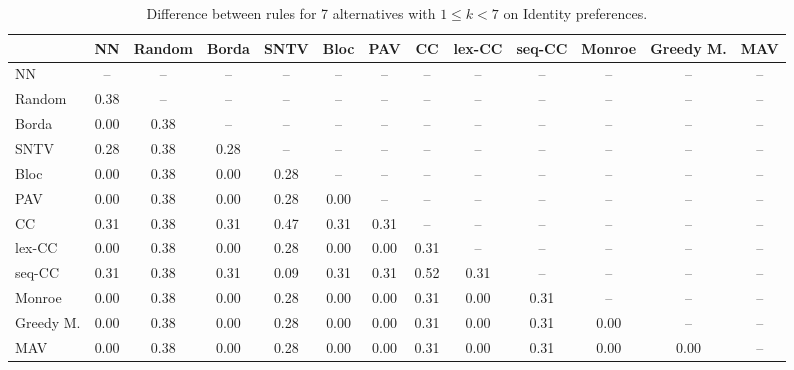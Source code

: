 
\begin{table*}[htbp]
\centering
\begin{tabular}{lcccccccccccc}
\toprule
 & NN & Random & Borda & SNTV & Bloc & PAV & CC & lex-CC & seq-CC & Monroe & Greedy M. & MAV \\
\midrule
NN & -- & -- & -- & -- & -- & -- & -- & -- & -- & -- & -- & -- \\
Random & \cellcolor{blue!38} 0.38 & -- & -- & -- & -- & -- & -- & -- & -- & -- & -- & -- \\
Borda & \cellcolor{blue!0} 0.00 & \cellcolor{blue!38} 0.38 & -- & -- & -- & -- & -- & -- & -- & -- & -- & -- \\
SNTV & \cellcolor{blue!28} 0.28 & \cellcolor{blue!38} 0.38 & \cellcolor{blue!28} 0.28 & -- & -- & -- & -- & -- & -- & -- & -- & -- \\
Bloc & \cellcolor{blue!0} 0.00 & \cellcolor{blue!38} 0.38 & \cellcolor{blue!0} 0.00 & \cellcolor{blue!28} 0.28 & -- & -- & -- & -- & -- & -- & -- & -- \\
PAV & \cellcolor{blue!0} 0.00 & \cellcolor{blue!38} 0.38 & \cellcolor{blue!0} 0.00 & \cellcolor{blue!28} 0.28 & \cellcolor{blue!0} 0.00 & -- & -- & -- & -- & -- & -- & -- \\
CC & \cellcolor{blue!31} 0.31 & \cellcolor{blue!38} 0.38 & \cellcolor{blue!31} 0.31 & \cellcolor{blue!47} 0.47 & \cellcolor{blue!31} 0.31 & \cellcolor{blue!31} 0.31 & -- & -- & -- & -- & -- & -- \\
lex-CC & \cellcolor{blue!0} 0.00 & \cellcolor{blue!38} 0.38 & \cellcolor{blue!0} 0.00 & \cellcolor{blue!28} 0.28 & \cellcolor{blue!0} 0.00 & \cellcolor{blue!0} 0.00 & \cellcolor{blue!31} 0.31 & -- & -- & -- & -- & -- \\
seq-CC & \cellcolor{blue!31} 0.31 & \cellcolor{blue!38} 0.38 & \cellcolor{blue!31} 0.31 & \cellcolor{blue!9} 0.09 & \cellcolor{blue!31} 0.31 & \cellcolor{blue!31} 0.31 & \cellcolor{blue!52} 0.52 & \cellcolor{blue!31} 0.31 & -- & -- & -- & -- \\
Monroe & \cellcolor{blue!0} 0.00 & \cellcolor{blue!38} 0.38 & \cellcolor{blue!0} 0.00 & \cellcolor{blue!28} 0.28 & \cellcolor{blue!0} 0.00 & \cellcolor{blue!0} 0.00 & \cellcolor{blue!31} 0.31 & \cellcolor{blue!0} 0.00 & \cellcolor{blue!31} 0.31 & -- & -- & -- \\
Greedy M. & \cellcolor{blue!0} 0.00 & \cellcolor{blue!38} 0.38 & \cellcolor{blue!0} 0.00 & \cellcolor{blue!28} 0.28 & \cellcolor{blue!0} 0.00 & \cellcolor{blue!0} 0.00 & \cellcolor{blue!31} 0.31 & \cellcolor{blue!0} 0.00 & \cellcolor{blue!31} 0.31 & \cellcolor{blue!0} 0.00 & -- & -- \\
MAV & \cellcolor{blue!0} 0.00 & \cellcolor{blue!38} 0.38 & \cellcolor{blue!0} 0.00 & \cellcolor{blue!28} 0.28 & \cellcolor{blue!0} 0.00 & \cellcolor{blue!0} 0.00 & \cellcolor{blue!31} 0.31 & \cellcolor{blue!0} 0.00 & \cellcolor{blue!31} 0.31 & \cellcolor{blue!0} 0.00 & \cellcolor{blue!0} 0.00 & -- \\
\bottomrule
\end{tabular}

\caption{Difference between rules for 7 alternatives with $1 \leq k < 7$ on Identity preferences.}
\label{tab:rule_distance_heatmap-m=[7]-pref_dist=identity}
\end{table*}
    